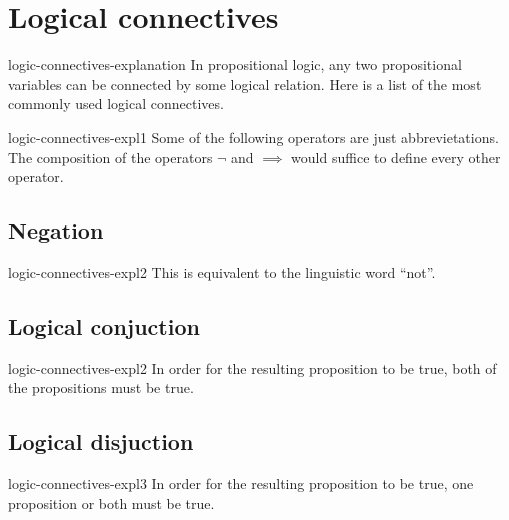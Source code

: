 \documentclass[preview]{standalone}
\begin{document}
\genpage

\section{Logical connectives}

\begin{snippet}{logic-connectives-explanation}
    In propositional logic, any two propositional variables can be connected by some logical relation.
    Here is a list of the most commonly used logical connectives.
\end{snippet}

\begin{snippetnote}{logic-connectives-expl1}{}
    Some of the following operators are just abbrevietations.
    The composition of the operators \(\lnot\) and \(\implies\)
    would suffice to define every other operator.
\end{snippetnote}

\subsection{Negation}


\begin{snippet}{logic-connectives-expl2}
This is equivalent to the linguistic word ``not''.
\end{snippet}

\subsection{Logical conjuction}


\begin{snippet}{logic-connectives-expl2}
In order for the resulting proposition to be true, both of the propositions
must be true.
\end{snippet}

\subsection{Logical disjuction}


\begin{snippet}{logic-connectives-expl3}
In order for the resulting proposition to be true, one proposition
or both must be true.
\end{snippet}
\end{document}
